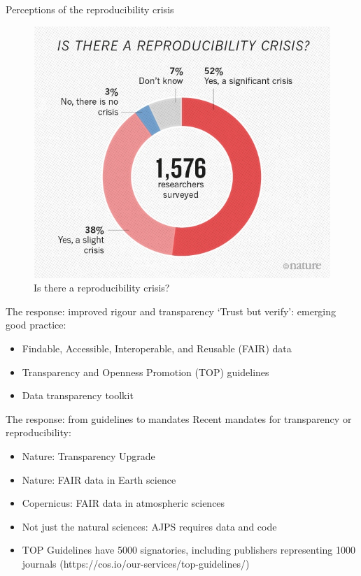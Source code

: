\documentclass[aspectratio=169, 12pt]{beamer} %
\begin{document}
\begin{frame}{Perceptions of the reproducibility crisis}
  \begin{figure}[H]
    \centering
        \includegraphics[height=.7\textheight]{figures/reproducibility-graphic-online1.jpeg}
        \caption{Is there a reproducibility crisis? \cite{Baker2016-cf}}
        \label{fig:figure1}
  \end{figure}
\end{frame}

\begin{frame}{The response: improved rigour and transparency}
  `Trust but verify': emerging good practice:
    \begin{itemize}
        \item Findable, Accessible, Interoperable, and Reusable (FAIR) data \cite{Wilkinson2016-mr, Go-fair2017-vs}
        \item Transparency and Openness Promotion (TOP) guidelines \cite{Nosek2015-wm}
        \item Data transparency toolkit \cite{Perkel2018-rw}
    \end{itemize}
\end{frame}

\begin{frame}{The response: from guidelines to mandates}
  Recent mandates for transparency or reproducibility:
    \begin{itemize}
        \item Nature: Transparency Upgrade \cite{Nature2017-lq}
        \item Nature: FAIR data in Earth science \cite{Nature2019-ng}
        \item Copernicus: FAIR data in atmospheric sciences \cite{Van_Edig2018-bu}
        \item Not just the natural sciences: AJPS requires data and code \cite{Jacoby2017-lw, Ajps2015-ex} 
        \item TOP Guidelines have 5000 signatories, including publishers representing 1000 journals (https://cos.io/our-services/top-guidelines/)
    \end{itemize}
\end{frame}
\end{document}
